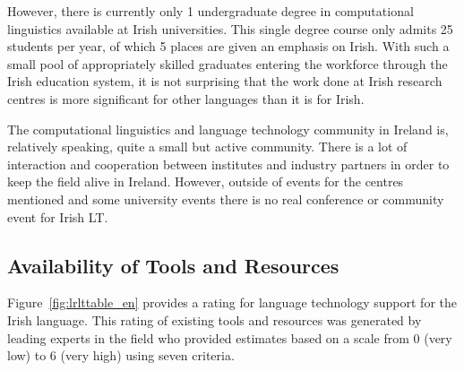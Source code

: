 \documentclass[]{../../metanetpaper}
\begin{document}
\begin{multicols}{2}
However, there is currently only 1 undergraduate degree in computational linguistics available at Irish universities. This single degree course only admits 25 students per year, of which 5 places are given an emphasis on Irish. With such a small pool of appropriately skilled graduates entering the workforce through the Irish education system, it is not surprising that the work done at Irish research centres is more significant for other languages than it is for Irish.

The computational linguistics and language technology community in Ireland is, relatively speaking, quite a small but active community. There is a lot of interaction and cooperation between institutes and industry partners in order to keep the field alive in Ireland. However, outside of events for the centres mentioned and some university events there is no real conference or community event for Irish LT.

\subsection{Availability of Tools and Resources}

Figure~\ref{fig:lrlttable_en} provides a rating for language technology support for the Irish language. This rating of existing tools and resources was generated by leading experts in the field who provided estimates based on a scale from 0 (very low) to 6 (very high) using seven criteria.


\end{multicols}
\end{document}
